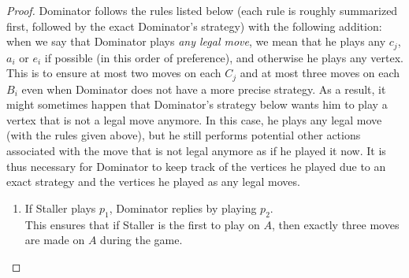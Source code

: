 \documentclass[12pt]{article}
\begin{document}
\begin{proof}
	Dominator follows the rules listed below (each rule is roughly summarized first, followed by the exact Dominator's strategy) with the following addition: when we say that Dominator plays \emph{any legal move}, we mean that he plays any $c_j$, $a_i$ or $e_i$ if possible (in this order of preference), and otherwise he plays any vertex. This is to ensure at most two moves on each $C_j$ and at most three moves on each $B_i$ even when Dominator does not have a more precise strategy. As a result, it might sometimes happen that Dominator's strategy below wants him to play a vertex that is not a legal move anymore. In this case, he plays any legal move (with the rules given above), but he still performs potential other actions associated with the move that is not legal anymore as if he played it now. It is thus necessary for Dominator to keep track of the vertices he played due to an exact strategy and the vertices he played as any legal moves. 
	\begin{enumerate}[(1)]
		\item If Staller plays $p_1$, Dominator replies by playing $p_2$.\\
		This ensures that if Staller is the first to play on $A$, then exactly three moves are made on $A$ during the game.
		

\end{enumerate}
\end{proof}
\end{document}
